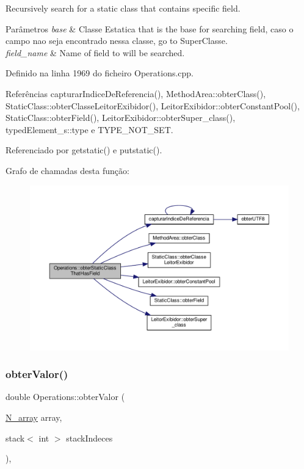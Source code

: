 Recursively search for a static class that contains specific field. 


\begin{DoxyParams}{Parâmetros}
{\em base} & Classe Estatica that is the base for searching field, caso o campo nao seja encontrado nessa classe, go to Super\+Classe. \\
\hline
{\em field\+\_\+name} & Name of field to will be searched. \\
\hline
\end{DoxyParams}


Definido na linha 1969 do ficheiro Operations.\+cpp.



Referências capturar\+Indice\+De\+Referencia(), Method\+Area\+::obter\+Class(), Static\+Class\+::obter\+Classe\+Leitor\+Exibidor(), Leitor\+Exibidor\+::obter\+Constant\+Pool(), Static\+Class\+::obter\+Field(), Leitor\+Exibidor\+::obter\+Super\+\_\+class(), typed\+Element\+\_\+s\+::type e T\+Y\+P\+E\+\_\+\+N\+O\+T\+\_\+\+S\+ET.



Referenciado por getstatic() e putstatic().

Grafo de chamadas desta função\+:
\nopagebreak
\begin{figure}[H]
\begin{center}
\leavevmode
\includegraphics[width=350pt]{classOperations_a2e9f822a1a6b9b0fb374eafb5a55f9f4_cgraph}
\end{center}
\end{figure}
\mbox{\label{classOperations_a926006a1873abe481d6877428355fdf2}} 
\subsubsection{\texorpdfstring{obter\+Valor()}{obterValor()}}
{\footnotesize\ttfamily double Operations\+::obter\+Valor (\begin{DoxyParamCaption}\item[{\hyperlink{structN__array}{N\+\_\+array}}]{array,  }\item[{stack$<$ int $>$}]{stack\+Indeces }\end{DoxyParamCaption})\hspace{0.3cm}{\ttfamily [static]}, {\ttfamily [private]}}



